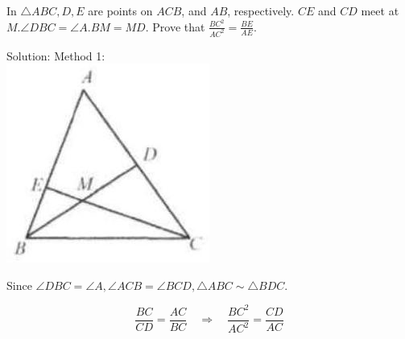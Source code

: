 \documentclass{article}
\begin{document}
In \(\triangle A B C, D, E\) are points on \(A C B\), and \(A B\), respectively. \(C E\) and \(C D\) meet at \(M . \angle D B C=\angle A . B M=M D\). Prove that \(\frac{B C^{2}}{A C^{2}}=\frac{B E}{A E}\).

Solution:
Method 1:\\
\centering
\includegraphics[width=\textwidth]{images/115.jpg}

Since \(\angle D B C=\angle A, \angle A C B=\angle B C D, \triangle A B C \sim \triangle B D C\).

\[
\frac{B C}{C D}=\frac{A C}{B C} \quad \Rightarrow \quad \frac{B C^{2}}{A C^{2}}=\frac{C D}{A C}
\]
\end{document}
